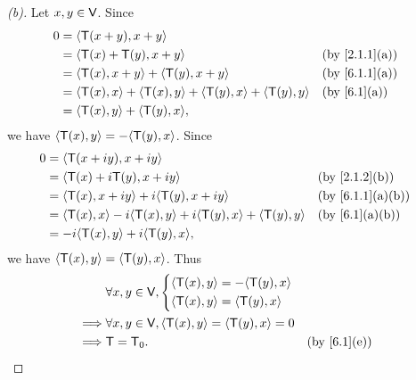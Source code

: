 \begin{proof}[(b)]
  Let \(x, y \in \mathsf{V}\).
  Since
  \begin{align*}
    0 & = \inn{\T(x + y), x + y}                                                                             \\
      & = \inn{\T(x) + \T(y), x + y}                                        &  & \text{(by \cref{2.1.1}(a))} \\
      & = \inn{\T(x), x + y} + \inn{\T(y), x + y}                           &  & \text{(by \cref{6.1.1}(a))} \\
      & = \inn{\T(x), x} + \inn{\T(x), y} + \inn{\T(y), x} + \inn{\T(y), y} &  & \text{(by \cref{6.1}(a))}   \\
      & = \inn{\T(x), y} + \inn{\T(y), x},
  \end{align*}
  we have \(\inn{\T(x), y} = - \inn{\T(y), x}\).
  Since
  \begin{align*}
    0 & = \inn{\T(x + iy), x + iy}                                                                                  \\
      & = \inn{\T(x) + i \T(y), x + iy}                                         &  & \text{(by \cref{2.1.2}(b))}    \\
      & = \inn{\T(x), x + iy} + i \inn{\T(y), x + iy}                           &  & \text{(by \cref{6.1.1}(a)(b))} \\
      & = \inn{\T(x), x} - i \inn{\T(x), y} + i \inn{\T(y), x} + \inn{\T(y), y} &  & \text{(by \cref{6.1}(a)(b))}   \\
      & = -i \inn{\T(x), y} + i \inn{\T(y), x},
  \end{align*}
  we have \(\left\langle\mathsf{T}(x), y\right\rangle = \left\langle\mathsf{T}(y), x\right\rangle\).
  Thus
  \begin{align*}
             & \forall x, y \in \V, \begin{dcases}
                                      \inn{\T(x), y} = - \inn{\T(y), x} \\
                                      \inn{\T(x), y} = \inn{\T(y), x}
                                    \end{dcases}                                  \\
    \implies & \forall x, y \in \V, \inn{\T(x), y} = \inn{\T(y), x} = 0                                \\
    \implies & \T = \zT.                                                &  & \text{(by \cref{6.1}(e))}
  \end{align*}
\end{proof}

